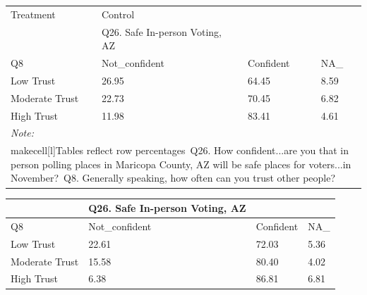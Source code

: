 \documentclass[
  11pt,
  a4paper,
]{article}
\begin{document}
\begin{table}
\centering
\centering
\begin{tabular}[t]{l|l|l|l}
\hline
\multicolumn{1}{l|}{Treatment} & \multicolumn{1}{l}{Control} \\
\cline{1-1} \cline{2-2}
 & Q26. Safe In-person Voting, AZ &  & \\
\hline
Q8 & Not\_confident & Confident & NA\_\\
\hline
Low Trust & 26.95 & 64.45 & 8.59\\
\hline
Moderate Trust & 22.73 & 70.45 & 6.82\\
\hline
High Trust & 11.98 & 83.41 & 4.61\\
\hline
\multicolumn{4}{l}{\rule{0pt}{1em}\textit{Note: }}\\
\multicolumn{4}{l}{\rule{0pt}{1em}makecell[l]{Tables reflect row percentages\ Q26. How confident...are you that in person polling places in Maricopa County, AZ will be safe places for voters...in November?\ Q8. Generally speaking, how often can you trust other people?}}\\
\end{tabular}
\centering
\begin{tabular}[t]{l|l|l|l}
\hline
 & Q26. Safe In-person Voting, AZ &  & \\
\hline
Q8 & Not\_confident & Confident & NA\_\\
\hline
Low Trust & 22.61 & 72.03 & 5.36\\
\hline
Moderate Trust & 15.58 & 80.40 & 4.02\\
\hline
High Trust & 6.38 & 86.81 & 6.81\\
\hline
\end{tabular}
\end{table}
\end{document}

